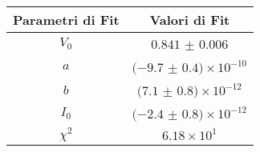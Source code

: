 \begin{tabular}{cc}
\hline
	Parametri di Fit & Valori di Fit\\ 
\hline
	$V_0$ & $0.841$ $\pm$ $0.006$ \\
	$a$ & $(-9.7$ $\pm$ $0.4)\times 10^{-10}$ \\
	$b$ & $(7.1$ $\pm$ $0.8)\times 10^{-12}$ \\
	$I_0$ & $(-2.4$ $\pm$ $0.8)\times 10^{-12}$ \\
	$\chi^2$ & $6.18\times 10^{1}$ \\
\hline
\end{tabular}
